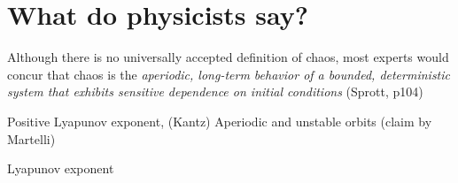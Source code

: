 \documentclass[11pt]{article}
\begin{document}
\section{What do physicists say?}
Although there is no universally accepted definition of chaos,
most experts would concur that chaos is the {\it aperiodic,
  long-term behavior of a bounded, deterministic system
that exhibits sensitive dependence on initial conditions} (Sprott, p104)

Positive Lyapunov exponent, (Kantz)
Aperiodic and unstable orbits (claim by Martelli)

Lyapunov exponent
\end{document}
